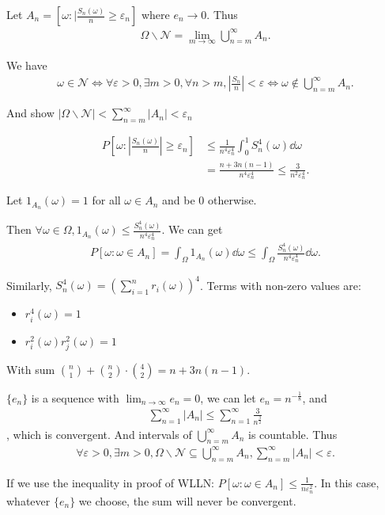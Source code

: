 Let $A_n = [\omega :|\frac{S_n(\omega )}{n}\ge \varepsilon _n]$ where $e_n \to 0$. Thus 
\begin{align*}
    \Omega \backslash \mathcal{N} = \lim_{m\to \infty}\bigcup _{n=m}^\infty A_n
.\end{align*}

\begin{qte}{}{}
    We have
    \begin{align*}
        \omega \in \mathcal{N} \iff \forall \varepsilon > 0, \exists m > 0, \forall n>m,|\frac{S_n}{n}| < \varepsilon \iff \omega \not\in \bigcup_{n=m}^\infty A_n
    .\end{align*}

    And show $|\Omega \backslash \mathcal{N}| < \sum_{n=m}^\infty |A_n| < \varepsilon_n $
\end{qte}

\begin{align*}
    P[\omega : |\frac{S_n(\omega )}{n}| \ge \varepsilon_n ] &\le \frac{1}{n^4\varepsilon_n ^4} \int_0^1 S_n^4(\omega )\dd\omega  \\
                                                          &=\frac{n+3n(n-1)}{n^4\varepsilon_n ^4} \le \frac{3}{n^2\varepsilon_n ^4}
.\end{align*}

\begin{qte}
    Let $1_{A_n}(\omega ) = 1$ for all $\omega \in A_n$ and be $0$ otherwise.

    Then $\forall \omega \in \Omega , 1_{A_n}(\omega ) \le \frac{S_n^4(\omega )}{n^4 \varepsilon _n^4}$. We can get
    \begin{align*}
        P[\omega :\omega \in A_n] = \int_\Omega 1_{A_n}(\omega ) \dd \omega \le \int_\Omega \frac{S^4_n(\omega) }{n^4\varepsilon _n^4} \dd \omega 
    .\end{align*}

    Similarly, $S^4_n(\omega ) = (\sum _{i=1}^n r_i(\omega ))^4$. Terms with non-zero values are:
    \begin{itemize}
        \item $r_i^4(\omega ) = 1$
        \item $r_i^2(\omega ) r_j^2(\omega ) = 1$
    \end{itemize}
    With sum $\binom n 1 + \binom n 2 \cdot \binom 4 2 = n + 3n(n-1)$.
\end{qte}

$\{e_n\}$ is a sequence with $\lim_{n\to \infty}e_n = 0$, we can let $e_n = n^{-\frac{1}{8}} $, and 
\begin{align*}
    \sum_{n=1}^\infty |A_n| \le  \sum_{n=1}^\infty\frac{3}{n^{\frac{3}{2}}}
\end{align*}
, which is convergent. And intervals of $\bigcup_{n=m}^\infty A_n$ is countable. Thus
\begin{align*}
    \forall \varepsilon > 0, \exists m > 0,  \Omega \backslash \mathcal{N} \subseteq \bigcup_{n=m}^\infty A_n, \sum _{n=m}^\infty |A_n| < \varepsilon 
.\end{align*}

\begin{qte}{}{}
    If we use the inequality in proof of WLLN: $P[\omega : \omega \in A_n] \le \frac{1}{n \varepsilon_n ^2}$. In this case, whatever $\{e_n\} $ we choose, the sum will never be convergent.
\end{qte}


